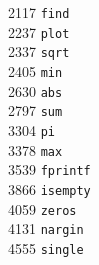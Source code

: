\begin{footnotesize}
\begin{multicols}{3}
\vspace{-.153cm} 2117  \hspace{.2cm} {\tt find                }      \\ %
\vspace{-.153cm} 2237  \hspace{.2cm} {\tt plot                }      \\ %
\vspace{-.153cm} 2337  \hspace{.2cm} {\tt sqrt                }      \\ %
\vspace{-.153cm} 2405  \hspace{.2cm} {\tt min                 }      \\ %
\vspace{-.153cm} 2630  \hspace{.2cm} {\tt abs                 }      \\ %
\vspace{-.153cm} 2797  \hspace{.2cm} {\tt sum                 }      \\ %
\vspace{-.153cm} 3304  \hspace{.2cm} {\tt pi                  }      \\ %
\vspace{-.153cm} 3378  \hspace{.2cm} {\tt max                 }      \\ %
\vspace{-.153cm} 3539  \hspace{.2cm} {\tt fprintf             }      \\ %
\vspace{-.153cm} 3866  \hspace{.2cm} {\tt isempty             }      \\ %
\vspace{-.153cm} 4059  \hspace{.2cm} {\tt zeros               }      \\ %
\vspace{-.153cm} 4131  \hspace{.2cm} {\tt nargin              }      \\ %
\vspace{-.153cm} 4555  \hspace{.2cm} {\tt single              }      \\ %

\end{multicols}
\end{footnotesize}
